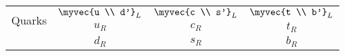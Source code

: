 \begin{table}[t]
\begin{tabular}{c |@{}| c c c }
    \midrule
    \multirow{3}{*}{Quarks}  & \multirow{2}{*}{$\myvec{u                                                                                                                 \\ d'}_L$}    & \multirow{2}{*}{$\myvec{c \\ s'}_L$}        & \multirow{2}{*}{$\myvec{t \\ b'}_L$}       \\
                             &                                &                                     &                 \\
                             & $u_R$                          & $ c_R$                              & $t_R$           \\
                             & $d_R$                          & $ s_R$                              & $b_R$          \\
    \bottomrule
  \end{tabular}
\end{table}
